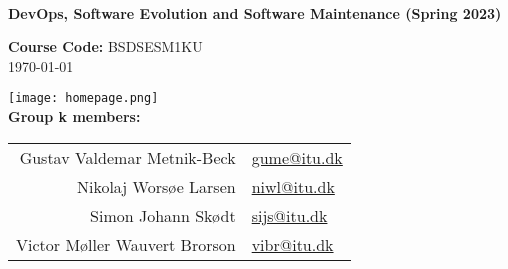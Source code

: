 \begin{titlepage}
    \begin{center}
        \\[0.5cm]
        
        \huge
        \textbf{DevOps, Software Evolution and Software Maintenance (Spring 2023)}\\
        \vspace{0.5cm}

        \Large
        \textbf{Course Code:} BSDSESM1KU\\[0.5cm]
        \large
        \today

        \texttt{[image: homepage.png]}\\

        \textbf{Group k members:}\\[0.2cm]
        \begin{tabular}{r l}
            Gustav Valdemar Metnik-Beck   & \href{mailto:gume@itu.dk}{gume@itu.dk}\\
            Nikolaj Worsøe Larsen         & \href{mailto:niwl@itu.dk}{niwl@itu.dk}\\
            Simon Johann Skødt            & \href{mailto:sijs@itu.dk}{sijs@itu.dk}\\
            Victor Møller Wauvert Brorson & \href{mailto:vibr@itu.dk}{vibr@itu.dk}      
        \end{tabular}\\[0.8cm]
    \end{center}
\end{titlepage}
